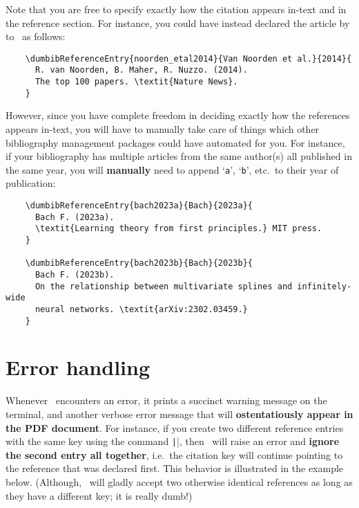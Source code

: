 \documentclass[letter, 11pt]{article}
\begin{document}


  Note that you are free to specify exactly how the citation appears in-text and in the reference section. For instance, you could have instead declared the article  by \cite{noorden_etal2014} to \dumbib\ as follows:
  \begin{verbatim}
    \dumbibReferenceEntry{noorden_etal2014}{Van Noorden et al.}{2014}{
      R. van Noorden, B. Maher, R. Nuzzo. (2014).
      The top 100 papers. \textit{Nature News}.
    }
  \end{verbatim}
  However, since you have complete freedom in deciding exactly how the references appears in-text, you will have to manually take care of things which other bibliography management packages could have automated for you. For instance, if your bibliography has multiple articles from the same author(s) all published in the same year, you will \textbf{manually} need to append `\texttt{a}', `\texttt{b}', etc.\ to their year of publication:
  \begin{verbatim}
    \dumbibReferenceEntry{bach2023a}{Bach}{2023a}{
      Bach F. (2023a).
      \textit{Learning theory from first principles.} MIT press.
    }
    
    \dumbibReferenceEntry{bach2023b}{Bach}{2023b}{
      Bach F. (2023b).
      On the relationship between multivariate splines and infinitely-wide
      neural networks. \textit{arXiv:2302.03459.}
    }
  \end{verbatim}
    
  
  
  \section{Error handling}
  Whenever \dumbib\ encounters an error, it prints a succinct warning message on the terminal, and another verbose error message that will \textbf{ostentatiously appear in the PDF document}. For instance, if you create two different reference entries with the same key using the command \texttt|\dumbibReferenceEntry|, then \dumbib\ will raise an error and \textbf{ignore the second entry all together}, i.e.\ the citation key will continue pointing to the reference that was declared first. This behavior is illustrated in the example below. (Although, \dumbib\ will gladly accept two otherwise identical references as long as they have a different key; it is really dumb!)
\end{document}
